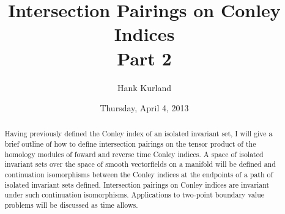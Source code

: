 \documentclass{UAmathtalk}
\author{Hank Kurland}
\title{Intersection Pairings on Conley Indices\\ Part 2}
\date{Thursday, April 4, 2013}
\begin{document}
\maketitle

\begin{abstract}
Having previously defined the Conley index of an isolated invariant set, I will give a brief outline of how to define intersection pairings on the tensor product of the homology modules of foward and reverse time Conley indices. A space of isolated invariant sets over the space of smooth vectorfields on a manifold will be defined and continuation isomorphisms between the Conley indices at the endpoints of a path of isolated invariant sets defined. Intersection pairings on Conley indices are invariant under such continuation isomorphisms. Applications to two-point boundary value problems will be discussed as time allows.
\end{abstract}
\end{document}
